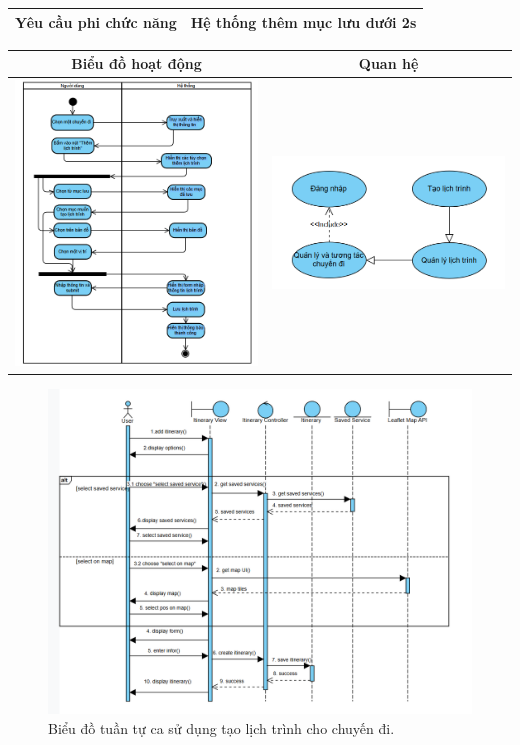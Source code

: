 \begin{tabularx}{\linewidth}{| l | X |}
    \hline 
    \textbf{Yêu cầu phi chức năng} & Hệ thống thêm mục lưu dưới 2s \\ 
    \hline 
    \end{tabularx}


\noindent 
\begin{tabular}{| c | c |}
    \hline
    \textbf{Biểu đồ hoạt động} & \textbf{Quan hệ} \\ 
    \hline
    \includegraphics[width=0.5\linewidth]{figures/c3/3-3-13-ad.png} 
    & 
    \includegraphics[width=0.45\linewidth]{figures/c3/3-3-13-rd.png} \\ 
    \hline
\end{tabular}


\begin{figure}[H]
    \centering  
    \includegraphics[width=1\textwidth]{figures/c3/3-3-13-sd.png}
    \caption{Biểu đồ tuần tự ca sử dụng tạo lịch trình cho chuyến đi.}
    \label{fig:3-3-13-sequence-diagram}
\end{figure}